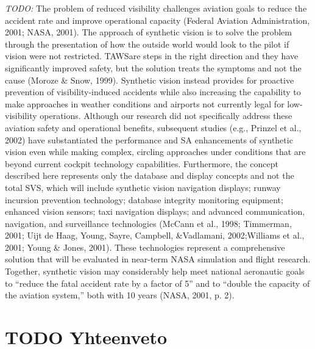 \documentclass[utf8,bachelor,manualbib]{gradu3}
\begin{document}
\emph{TODO:}
The problem of reduced visibility challenges aviation goals to reduce the accident
rate and improve operational capacity (Federal Aviation Administration, 2001;
NASA, 2001). The approach of synthetic vision is to solve the problem through the
presentation of how the outside world would look to the pilot if vision were not restricted.
TAWSare steps in the right direction and they have significantly improved
safety, but the solution treats the symptoms and not the cause (Moroze \& Snow,
1999). Synthetic vision instead provides for proactive prevention of visibility-induced
accidents while also increasing the capability to make approaches in
weather conditions and airports not currently legal for low-visibility operations.
Although our research did not specifically address these aviation safety and operational
benefits, subsequent studies (e.g., Prinzel et al., 2002) have substantiated the
performance and SA enhancements of synthetic vision even while making complex,
circling approaches under conditions that are beyond current cockpit technology
capabilities. Furthermore, the concept described here represents only the
database and display concepts and not the total SVS, which will include synthetic
vision navigation displays; runway incursion prevention technology; database integrity
monitoring equipment; enhanced vision sensors; taxi navigation displays;
and advanced communication, navigation, and surveillance technologies
(McCann et al., 1998; Timmerman, 2001; Uijt de Haag, Young, Sayre, Campbell,
\&Vadlamani, 2002;Williams et al., 2001; Young \& Jones, 2001). These technologies
represent a comprehensive solution that will be evaluated in near-term NASA
simulation and flight research. Together, synthetic vision may considerably help
meet national aeronautic goals to “reduce the fatal accident rate by a factor of 5”
and to “double the capacity of the aviation system,” both with 10 years (NASA,
2001, p. 2). \citep{prinzel2004}


\chapter{TODO Yhteenveto}
\end{document}

